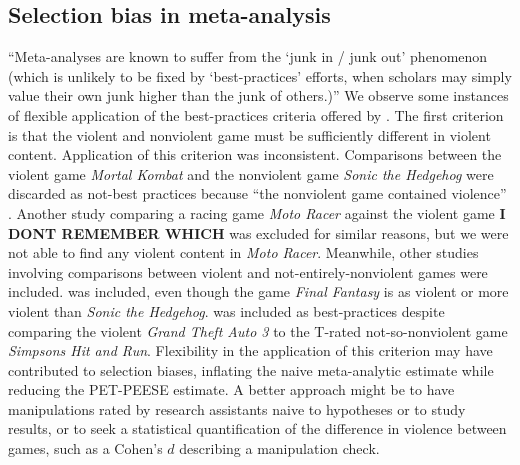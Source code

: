\documentclass[man]{apa6}
\begin{document}
\subsection{Selection bias in meta-analysis} 
``Meta-analyses are known to suffer from the `junk in / junk out' phenomenon (which is unlikely to be fixed by `best-practices' efforts, when scholars may simply value their own junk higher than the junk of others.)'' \citep{Ferguson:Heene:2012}
We observe some instances of flexible application of the best-practices criteria offered by \citet{Anderson:etal:2010}. The first criterion is that the violent and nonviolent game must be sufficiently different in violent content. Application of this criterion was inconsistent. Comparisons between the violent game {\em Mortal Kombat} and the nonviolent game {\em Sonic the Hedgehog} were discarded as not-best practices \citep[e.g.,][]{CITATION:NEEDED:2000} because ``the nonviolent game contained violence'' \citep[supplementary materials]{Anderson:etal:2010}. Another study comparing a racing game {\em Moto Racer} against the violent game \textbf{I DONT REMEMBER WHICH} \citep{Brooks:1996} was excluded for similar reasons, but we were not able to find any violent content in {\em Moto Racer}. Meanwhile, other studies involving comparisons between violent and not-entirely-nonviolent games were included. \citet{Konijn:etal:2007} was included, even though the game {\em Final Fantasy} is as violent or more violent than {\em Sonic the Hedgehog}. \citet{Brady:Mathews:2006} was included as best-practices despite comparing the violent {\em Grand Theft Auto 3} to the T-rated not-so-nonviolent game {\em Simpsons Hit and Run}. 
Flexibility in the application of this criterion may have contributed to selection biases, inflating the naive meta-analytic estimate while reducing the PET-PEESE estimate. A better approach might be to have manipulations rated by research assistants naive to hypotheses or to study results, or to seek a statistical quantification of the difference in violence between games, such as a Cohen's $d$ describing a manipulation check.
\end{document}
